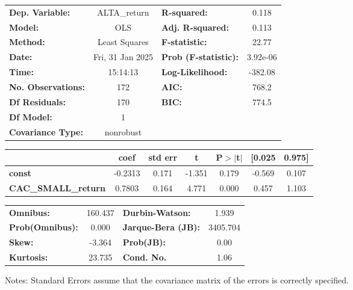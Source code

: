 \documentclass{report}
\begin{document}
\begin{center}
\begin{tabular}{lclc}
\toprule
\textbf{Dep. Variable:}     &   ALTA\_return   & \textbf{  R-squared:         } &     0.118   \\
\textbf{Model:}             &       OLS        & \textbf{  Adj. R-squared:    } &     0.113   \\
\textbf{Method:}            &  Least Squares   & \textbf{  F-statistic:       } &     22.77   \\
\textbf{Date:}              & Fri, 31 Jan 2025 & \textbf{  Prob (F-statistic):} &  3.92e-06   \\
\textbf{Time:}              &     15:14:13     & \textbf{  Log-Likelihood:    } &   -382.08   \\
\textbf{No. Observations:}  &         172      & \textbf{  AIC:               } &     768.2   \\
\textbf{Df Residuals:}      &         170      & \textbf{  BIC:               } &     774.5   \\
\textbf{Df Model:}          &           1      & \textbf{                     } &             \\
\textbf{Covariance Type:}   &    nonrobust     & \textbf{                     } &             \\
\bottomrule
\end{tabular}
\begin{tabular}{lcccccc}
                            & \textbf{coef} & \textbf{std err} & \textbf{t} & \textbf{P$> |$t$|$} & \textbf{[0.025} & \textbf{0.975]}  \\
\midrule
\textbf{const}              &      -0.2313  &        0.171     &    -1.351  &         0.179        &       -0.569    &        0.107     \\
\textbf{CAC\_SMALL\_return} &       0.7803  &        0.164     &     4.771  &         0.000        &        0.457    &        1.103     \\
\bottomrule
\end{tabular}
\begin{tabular}{lclc}
\textbf{Omnibus:}       & 160.437 & \textbf{  Durbin-Watson:     } &    1.939  \\
\textbf{Prob(Omnibus):} &   0.000 & \textbf{  Jarque-Bera (JB):  } & 3405.704  \\
\textbf{Skew:}          &  -3.364 & \textbf{  Prob(JB):          } &     0.00  \\
\textbf{Kurtosis:}      &  23.735 & \textbf{  Cond. No.          } &     1.06  \\
\bottomrule
\end{tabular}
\end{center}

Notes: \newline
 [1] Standard Errors assume that the covariance matrix of the errors is correctly specified.
\end{document}
